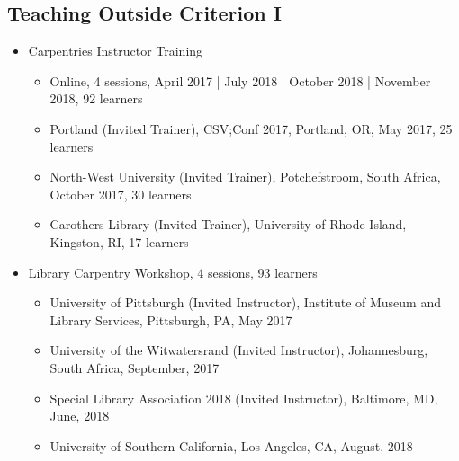 \subsection{Teaching Outside Criterion I}
\begin{itemize}[label={},leftmargin=!,labelindent=5pt,itemindent=-15pt]
  \item Carpentries Instructor Training
  \begin{itemize}
    \item Online, 4 sessions, April 2017 | July 2018 | October 2018 | November 2018, 92 learners
    \item Portland (Invited Trainer), CSV;Conf 2017, Portland, OR, May 2017, 25 learners
    \item North-West University (Invited Trainer), Potchefstroom, South Africa, October 2017, 30 learners
    \item Carothers Library (Invited Trainer), University of Rhode Island, Kingston, RI, 17 learners
  \end{itemize}
  \item Library Carpentry Workshop, 4 sessions,	93 learners
  \begin{itemize}
    \item University of Pittsburgh (Invited Instructor), Institute of Museum and Library Services, Pittsburgh, PA, May 2017
    \item University of the Witwatersrand (Invited Instructor), Johannesburg, South Africa, September, 2017
    \item Special Library Association 2018 (Invited Instructor), Baltimore, MD, June, 2018
    \item University of Southern California, Los Angeles, CA, August, 2018
  \end{itemize}
\end{itemize}
